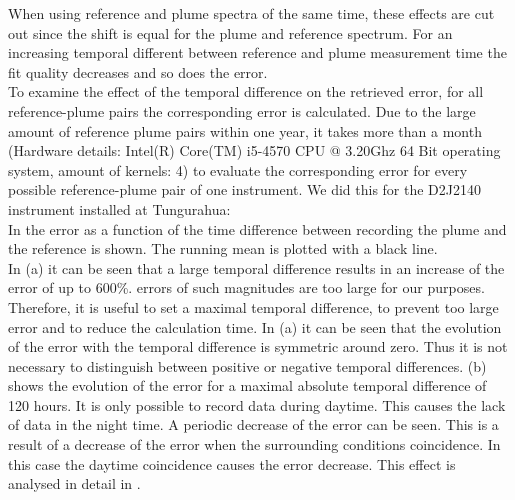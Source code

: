 When using reference and plume spectra of the same time, these effects are cut out since the shift is equal for the plume and reference spectrum.
For an increasing temporal different between reference and plume measurement time the fit quality decreases and so does the  error.\\
To examine the effect of the temporal difference on the retrieved  error, for all reference-plume pairs the corresponding  error is calculated. Due to the large amount of reference plume pairs within one year, it takes more than a month (Hardware details: Intel(R) Core(TM) i5-4570 CPU @ 3.20Ghz 64 Bit operating system, amount of kernels: 4) to evaluate the corresponding  error for every possible reference-plume pair of one instrument. We did this for the  D2J2140 instrument installed at Tungurahua:\\
In  the  error as a function of the time difference between recording the plume and the reference is shown. The running mean is plotted with a black line. \\
In  (a) it can be seen that a large temporal difference results in an increase of the   error of up to 600\%.  errors of such magnitudes are too large for our purposes. Therefore, it is useful to set a maximal temporal difference, to prevent too large  error and to reduce the calculation time.
%
In  (a) it can be seen that the evolution of the   error with the temporal difference is symmetric around zero. Thus it is not necessary to distinguish between positive or negative temporal differences.
%
 (b) shows the evolution of the  error for a maximal absolute temporal difference of 120 hours. It is only possible to record data during daytime. This causes the lack of data in the night time. A periodic decrease of the  error can be seen. This is a result of a decrease of the  error when the surrounding conditions coincidence. In this case the daytime coincidence causes the   error decrease. This effect is analysed in detail in .\\


